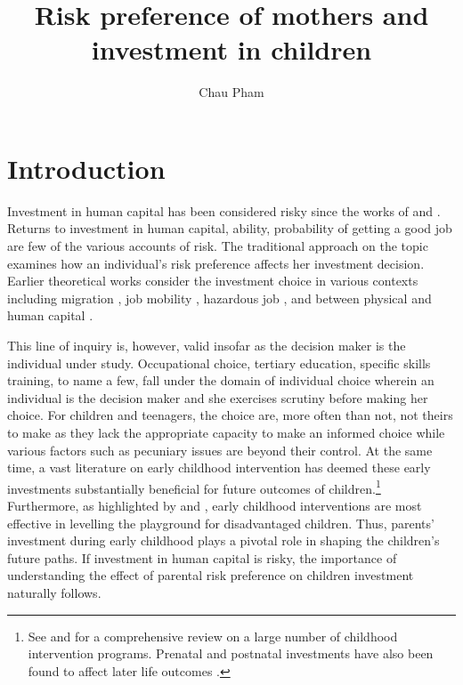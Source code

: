 \documentclass[]{article}
\title{Risk preference of mothers and investment in children}
\author{Chau Pham}
\begin{document}
\maketitle
\onehalfspacing



\section{Introduction}
Investment in human capital has been considered risky since the works of \citet{becker1962investment, levhari1974effect} and \citet{schultz1971investment}. Returns to investment in human capital, ability, probability of getting a good job are few of the various accounts of risk. The traditional approach on the topic examines how an individual's risk preference affects her investment decision. Earlier theoretical works consider the investment choice in various contexts including migration \citep{david1974fortune}, job mobility \citep{johnson1978theory}, hazardous job \citep{thaler1976value}, and between physical and human capital \citep{levhari1974effect}. 

This line of inquiry is, however, valid insofar as the decision maker is the individual under study. Occupational choice, tertiary education, specific skills training, to name a few, fall under the domain of individual choice wherein an individual is the decision maker and she exercises scrutiny before making her choice. For children and teenagers, the choice are, more often than not, not theirs to make as they lack the appropriate capacity to make an informed choice while various factors such as pecuniary issues are beyond their control. At the same  time, a vast literature on early childhood intervention has deemed these early investments substantially beneficial for future outcomes of children.\footnote{See \citet{Currie2001} and \citet{NORES2010} for a comprehensive review on a large number of childhood intervention programs. Prenatal and postnatal investments have also been found to affect later life outcomes \citep{currie2011human, almond2011killing, currie2013early}.} Furthermore, as highlighted by \citet{jacob2008improving} and \citet{duflo2011poor}, early childhood interventions are most effective in levelling the playground for disadvantaged children. Thus, parents' investment during early childhood plays a pivotal role in shaping the children's future paths. If investment in human capital is risky, the importance of understanding the effect of parental risk preference on children investment naturally follows.
\end{document}
